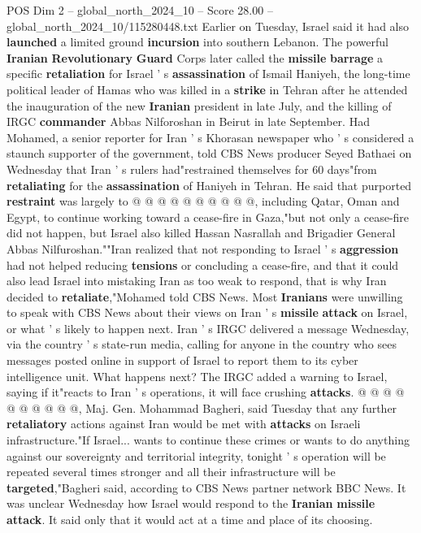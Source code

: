 \begin{textsample}{POS Dim 2 – global\_north\_2024\_10 – Score 28.00 – global\_north\_2024\_10/115280448.txt}
Earlier on Tuesday, Israel said it had also \textbf{launched} a limited ground \textbf{incursion} into southern Lebanon.
The powerful \textbf{Iranian} \textbf{Revolutionary} \textbf{Guard} Corps later called the \textbf{missile} \textbf{barrage} a specific \textbf{retaliation} for Israel ' s \textbf{assassination} of Ismail Haniyeh, the long-time political leader of Hamas who was killed in a \textbf{strike} in Tehran after he attended the inauguration of the new \textbf{Iranian} president in late July, and the killing of IRGC \textbf{commander} Abbas Nilforoshan in Beirut in late September.
Had Mohamed, a senior reporter for Iran ' s Khorasan newspaper who ' s considered a staunch supporter of the government, told CBS News producer Seyed Bathaei on Wednesday that Iran ' s rulers had"restrained themselves for 60 days"from \textbf{retaliating} for the \textbf{assassination} of Haniyeh in Tehran.
He said that purported \textbf{restraint} was largely to @ @ @ @ @ @ @ @ @ @, including Qatar, Oman and Egypt, to continue working toward a cease-fire in Gaza,"but not only a cease-fire did not happen, but Israel also killed Hassan Nasrallah and Brigadier General Abbas Nilfuroshan.""Iran realized that not responding to Israel ' s \textbf{aggression} had not helped reducing \textbf{tensions} or concluding a cease-fire, and that it could also lead Israel into mistaking Iran as too weak to respond, that is why Iran decided to \textbf{retaliate},"Mohamed told CBS News.
Most \textbf{Iranians} were unwilling to speak with CBS News about their views on Iran ' s \textbf{missile} \textbf{attack} on Israel, or what ' s likely to happen next.
Iran ' s IRGC delivered a message Wednesday, via the country ' s state-run media, calling for anyone in the country who sees messages posted online in support of Israel to report them to its cyber intelligence unit.
What happens next?
The IRGC added a warning to Israel, saying if it"reacts to Iran ' s operations, it will face crushing \textbf{attacks}. @ @ @ @ @ @ @ @ @ @, Maj.
Gen.
Mohammad Bagheri, said Tuesday that any further \textbf{retaliatory} actions against Iran would be met with \textbf{attacks} on Israeli infrastructure."If Israel... wants to continue these crimes or wants to do anything against our sovereignty and territorial integrity, tonight ' s operation will be repeated several times stronger and all their infrastructure will be \textbf{targeted},"Bagheri said, according to CBS News partner network BBC News.
It was unclear Wednesday how Israel would respond to the \textbf{Iranian} \textbf{missile} \textbf{attack}.
It said only that it would act at a time and place of its choosing.

\end{textsample}
